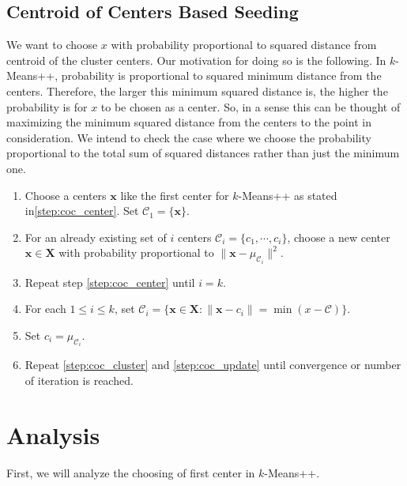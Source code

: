 \documentclass[twoside, 11pt]{article}
\newcommand{\x}{\mathbf{x}}
\newcommand{\X}{\mathbf{X}}
\newcommand{\C}{\mathcal{C}}
\begin{document}
	\subsection{Centroid of Centers Based Seeding}
	We want to choose $x$ with probability proportional to squared distance from centroid of the cluster centers. Our motivation for doing so is the following. In $k$-Means++, probability is proportional to squared minimum distance from the centers. Therefore, the larger this minimum squared distance is, the higher the probability is for $x$ to be chosen as a center. So, in a sense this can be thought of maximizing the minimum squared distance from the centers to the point in consideration. We intend to check the case where we choose the probability proportional to the total sum of squared distances rather than just the minimum one.
		\begin{enumerate}[i]
			\item Choose a centers $\x$ like the first center for $k$-Means++ as stated in\eqref{step:coc_center}. Set $\C_1=\{\x\}$.
			\item For an already existing set of $i$ centers $\mathcal{C}_i=\{c_1,\cdots,c_i\}$, choose a new center $\x\in\X$ with probability proportional to $\|\x-\mu_{\C_i}\|^2$.\label{step:coc_center}
			\item Repeat step \eqref{step:coc_center} until $i=k$.
			\item For each $1\leq i\leq k$, set $\C_i=\{\x\in\X:\|\x-c_i\|=\min(x-\C)\}$.\label{step:coc_cluster}
			\item Set $c_i=\mu_{\C_i}$.\label{step:coc_update}
			\item Repeat \eqref{step:coc_cluster} and \eqref{step:coc_update} until convergence or number of iteration is reached.
		\end{enumerate}
	\section{Analysis}
	First, we will analyze the choosing of first center in $k$-Means++. 
\end{document}
